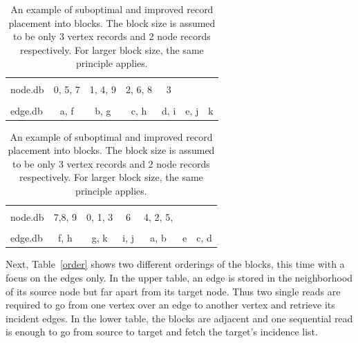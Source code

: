   
     \begin{table}[htp]
     \centering
    \begin{tabular}[c]{|l|c|c|c|c|c|c|} \hline
    &&&&&&\\[-1em]
     node.db & \colorbox{blue!30}{0}, \colorbox{red!30}{5}, \colorbox{green!30}{7} & \colorbox{blue!30}{1}, \colorbox{blue!30}{4}, \colorbox{green!30}{9} & \colorbox{blue!30}{2}, \colorbox{red!30}{6}, \colorbox{green!30}{8} & \colorbox{blue!30}{3} &  & \\ \hline
     &&&&&&\\[-1em]
     edge.db & \colorbox{blue!30}{a}, \colorbox{green!30}{f} & \colorbox{blue!30}{b}, \colorbox{green!30}{g} & \colorbox{blue!30}{c}, \colorbox{green!30}{h} & \colorbox{blue!30}{d}, \colorbox{green!30}{i} & \colorbox{red!30}{e}, \colorbox{green!30}{j} & \colorbox{green!30}{k} \\  \hline
    \end{tabular}
    \vspace{0.5cm}
    
    \begin{tabular}{|l | c | c | c | c | c | c|} \hline
    &&&&&&\\[-1em]
     node.db & \colorbox{green!30}{7},\colorbox{green!30}{8}, \colorbox{green!30}{9} & \colorbox{blue!30}{0}, \colorbox{blue!30}{1}, \colorbox{blue!30}{3} & \colorbox{red!30}{6} & \colorbox{blue!30}{4}, \colorbox{blue!30}{2}, \colorbox{red!30}{5},  &  & \\ \hline
     &&&&&&\\[-1em]
     edge.db &  \colorbox{green!30}{f}, \colorbox{green!30}{h} & \colorbox{green!30}{g}, \colorbox{green!30}{k} & \colorbox{green!30}{i}, \colorbox{green!30}{j} & \colorbox{blue!30}{a}, \colorbox{blue!30}{b} & \colorbox{red!30}{e} & \colorbox{blue!30}{c}, \colorbox{blue!30}{d} \\ \hline
    \end{tabular}
  \caption{An example of suboptimal and improved record placement into blocks. 
  The block size is assumed to be only 3 vertex records and 2 node records respectively. 
  For larger block size, the same principle applies.}
   \label{blocks}
   \end{table}
    
  Next, Table~\ref{order} shows two different orderings of the blocks, this time with a focus on the edges only. 
  In the upper table, an edge is stored in the neighborhood of its source node but far apart from its target node.
  Thus two single reads are required to go from one vertex over an edge to another vertex and retrieve its incident edges. 
  In the lower table, the blocks are adjacent and one sequential read is enough to go from source to target and fetch the target's incidence list.
  
